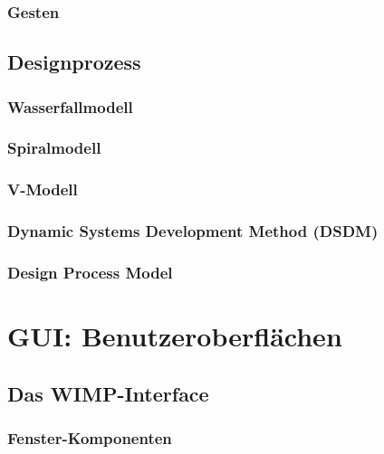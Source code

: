 \documentclass[a4paper, 11pt, accentcolor = tud3b]{tudreport}
\begin{document}
				\subsubsection{Gesten} %

			\subsection{Designprozess} %

				\subsubsection{Wasserfallmodell} %

				\subsubsection{Spiralmodell} %

				\subsubsection{V-Modell} %

				\subsubsection{Dynamic Systems Development Method (DSDM)} %

				\subsubsection{Design Process Model} %

		\section{GUI: Benutzeroberflächen} %

			\subsection{Das WIMP-Interface} %

				\subsubsection{Fenster-Komponenten} %
\end{document}
